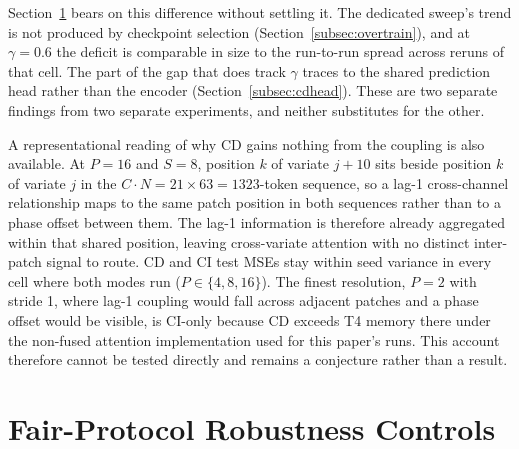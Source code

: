 \documentclass[10pt]{article} %
\begin{document}
    Section~\ref{sec:robustness} bears on this difference without settling it. The dedicated sweep's trend is not produced
    by checkpoint selection (Section~\ref{subsec:overtrain}), and at $\gamma = 0.6$ the deficit is comparable in size to
    the run-to-run spread across reruns of that cell. The part of the gap that does track $\gamma$ traces to the
    shared prediction head rather than the encoder (Section~\ref{subsec:cdhead}). These are two separate findings from
    two separate experiments, and neither substitutes for the other.

    A representational reading of why CD gains nothing from the coupling is also available. At $P = 16$ and $S = 8$, position
    $k$ of variate $j+10$ sits beside position $k$ of variate $j$ in the $C \cdot N = 21 \times 63 = 1323$-token sequence, so
    a lag-1 cross-channel relationship maps to the same patch position in both sequences rather than to a phase offset between
    them. The lag-1 information is therefore already aggregated within that shared position, leaving cross-variate attention
    with no distinct inter-patch signal to route. CD and CI test MSEs stay within seed variance in every cell where both modes
    run ($P \in \{4, 8, 16\}$). The finest resolution, $P = 2$ with stride 1, where lag-1 coupling would fall across adjacent
    patches and a phase offset would be visible, is CI-only because CD exceeds T4 memory there under the non-fused attention implementation used for this paper's
    runs. This account therefore cannot
    be tested directly and remains a conjecture rather than a result.

    \section{Fair-Protocol Robustness Controls}
    \label{sec:robustness}
\end{document}
